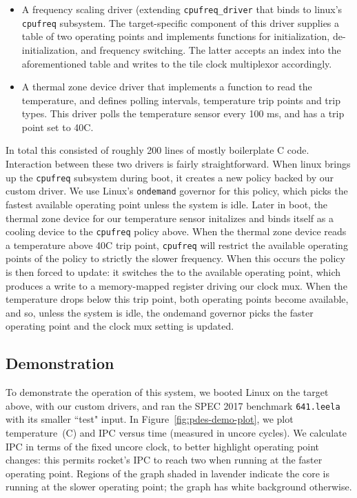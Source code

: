 \begin{itemize}
\item A frequency scaling driver (extending \texttt{cpufreq\_driver} that binds to
linux's \texttt{cpufreq} subsystem. The target-specific component of this
driver supplies a table of two operating points and implements functions for
initialization, de-initialization, and frequency switching. The latter accepts an index
into the aforementioned table and writes to the tile clock multiplexor accordingly.

\item A thermal zone device driver that implements a function to read the
temperature, and defines polling intervals, temperature trip points and
trip types. This driver polls the temperature sensor every 100 ms, and
has a trip point set to 40C.

\end{itemize}

In total this consisted of roughly 200 lines of mostly boilerplate C code.
Interaction between these two drivers is fairly straightforward.  When linux
brings up the \texttt{cpufreq} subsystem during boot, it creates a new policy
backed by our custom driver. We use Linux's \texttt{ondemand} governor for this
policy, which picks the fastest available operating point unless the system is
idle. Later in boot, the thermal zone device for our temperature sensor
initalizes and binds itself as a cooling device to the \texttt{cpufreq} policy
above. When the thermal zone device reads a temperature above 40C trip point,
\texttt{cpufreq} will restrict the available operating points of the policy to
strictly the slower frequency. When this occurs the policy is then forced to
update: it switches the to the available operating point, which produces a
write to a memory-mapped register driving our clock mux. When the temperature
drops below this trip point, both operating points become available, and so,
unless the system is idle, the ondemand governor picks the faster operating
point and the clock mux setting is updated.

\subsection{Demonstration}

To demonstrate the operation of this system, we booted Linux on the target
above, with our custom drivers, and ran the SPEC 2017 benchmark
\texttt{641.leela} with its smaller ``test" input. In
Figure~\ref{fig:pdes-demo-plot}, we plot temperature~(C) and IPC versus time
(measured in uncore cycles). We calculate IPC in terms of the fixed uncore
clock, to better highlight operating point changes: this permits rocket's IPC
to reach two when running at the faster operating point.  Regions of the graph
shaded in lavender indicate the core is running at the slower operating point;
the graph has white background otherwise.

